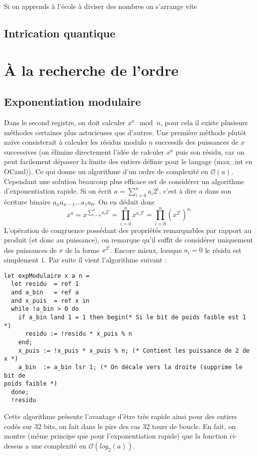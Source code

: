 \documentclass[a4paper,10pt]{article}
\renewcommand{\O}{\ensuremath{\mathcal{O}}}
\newcommand{\code}[1]{#1}
\begin{document}
Si on apprends à l'école à diviser des nombres on s'arrange vite 
\subsection{Intrication quantique}
\section{À la recherche de l'ordre}
\subsection{Exponentiation modulaire}
Dans le second registre, on doit calculer $x ^ a \mod n$, pour cela il existe
plusieurs méthodes certaines plus astucieuses que d'autres. Une première
méthode plutôt naïve consisterait à calculer les résidus modulo $n$ successifs
des puissances de $x$ successives (on élimine directement l'idée de calculer
$x^a$ puis son résidu, car on peut facilement dépasser la limite des entiers
définie pour le langage (\code{max\_int} en OCaml)). Ce qui donne un
algorithme d'un ordre de complexité en $\O(a)$. Cependant une solution beaucoup
plus efficace est de considérer un algorithme d’exponentiation rapide.
Si on écrit $a = \sum_{i=0}^{n} a_i 2^i$, c'est à dire $a$ dans son écriture
binaire $a_n a_{n-1} \dots a_1 a_0$. On en déduit donc 
\[ x^a = x ^ {\sum_{i=0}^{n} a_i 2^i} = \prod_{i=0}^{n} x ^ {a_i 2^i}
 =  \prod_{i=0}^{n} \left( x ^ {2^i}\right) ^{a_i} \]
L'opération de congruence possédant des propriétés remarquables par rapport au
produit (et donc au puissance), on remarque qu'il suffit de considérer
uniquement des puissances de $x$ de la forme $x ^ {2^i}$. Encore mieux, lorsque
$a_i = 0$ le résidu est simplement $1$. Par suite il vient l'algorithme suivant
:
\begin{verbatim}
let expModulaire x a n =
  let residu  = ref 1
  and a_bin   = ref a
  and x_puis  = ref x in
  while !a_bin > 0 do
    if a_bin land 1 = 1 then begin(* Si le bit de poids faible est 1 *)
      residu := !residu * x_puis % n
    end;
    x_puis := !x_puis * x_puis % n; (* Contient les puissance de 2 de x *)
    a_bin  := a_bin lsr 1; (* On décale vers la droite (supprime le bit de
poids faible *)
  done;
  !residu
\end{verbatim}
Cette algorithme présente l'avantage d'être très rapide ainsi pour des entiers
codés sur $32$ bits, on fait dans le pire des cas $32$ tours de boucle. En
fait, on montre (même principe que pour l'exponentiation rapide) que la
fonction ci-dessus a une complexité en $\O(log_2(a))$. 
\end{document}
